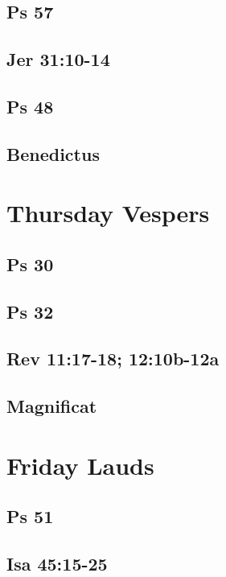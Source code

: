 \subsection{Ps 57}

\subsection{Jer 31:10-14}

\subsection{Ps 48}

\subsection{Benedictus}


\section{Thursday Vespers}

\subsection{Ps 30}

\subsection{Ps 32}

\subsection{Rev 11:17-18; 12:10b-12a}

\subsection{Magnificat}


\section{Friday Lauds}

\subsection{Ps 51}

\subsection{Isa 45:15-25}

